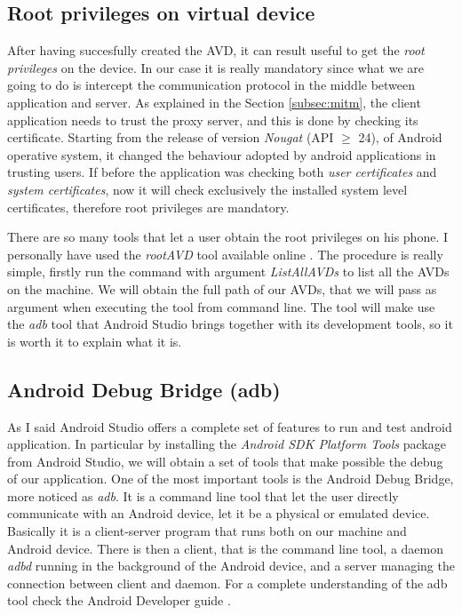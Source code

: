 		\subsection{Root privileges on virtual device}
			\par After having succesfully created the AVD, it can result useful to get the \textit{root privileges} on the device. In our case it is really mandatory since what we are going to do is intercept the communication protocol in the middle between application and server. As explained in the Section \ref{subsec:mitm}, the client application needs to trust the proxy server, and this is done by checking its certificate. Starting from the release of version \textit{Nougat} (API $\ge$ 24), of Android operative system, it changed the behaviour adopted by android applications in trusting users. If before the application was checking both \textit{user certificates} and \textit{system certificates}, now it will check exclusively the installed system level certificates, therefore root privileges are mandatory. \newline
			\par There are so many tools that let a user obtain the root privileges on his phone. I personally have used the \textit{rootAVD} tool available online \cite{rootAVD}. The procedure is really simple, firstly run the command with argument \textit{ListAllAVDs} to list all the AVDs on the machine. We will obtain the full path of our AVDs, that we will pass as argument when executing the tool from command line. The tool will make use the \textit{adb} tool that Android Studio brings together with its development tools, so it is worth it to explain what it is.
		
		\subsection{Android Debug Bridge (adb)}
			\par As I said Android Studio offers a complete set of features to run and test android application. In particular by installing the \textit{Android SDK Platform Tools} package from Android Studio, we will obtain a set of tools that make possible the debug of our application. \newline
			One of the most important tools is the Android Debug Bridge, more noticed as \textit{adb}. It is a command line tool that let the user directly communicate with an Android device, let it be a physical or emulated device. Basically it is a client-server program that runs both on our machine and Android device. There is then a client, that is the command line tool, a daemon \textit{adbd} running in the background of the Android device, and a server managing the connection between client and daemon. For a complete understanding of the adb tool check the Android Developer guide \cite{adb}.
		
